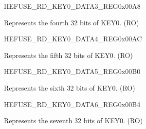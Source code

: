 \begin{register}{H}{EFUSE\_RD\_KEY0\_DATA3\_REG}{0x{}00A8}\label{regdesc:EFUSERDKEY0DATA3REG}
%
\regnewline%
\begin{regdesc}\begin{reglist}
\label{fielddesc:EFUSEKEY0DATA3}\item [EFUSE\_KEY0\_DATA3] Represents the fourth 32 bits of KEY0. (RO)
\end{reglist}\end{regdesc}
\end{register}


\begin{register}{H}{EFUSE\_RD\_KEY0\_DATA4\_REG}{0x{}00AC}\label{regdesc:EFUSERDKEY0DATA4REG}
%
\regnewline%
\begin{regdesc}\begin{reglist}
\label{fielddesc:EFUSEKEY0DATA4}\item [EFUSE\_KEY0\_DATA4] Represents the fifth 32 bits of KEY0. (RO)
\end{reglist}\end{regdesc}
\end{register}


\begin{register}{H}{EFUSE\_RD\_KEY0\_DATA5\_REG}{0x{}00B0}\label{regdesc:EFUSERDKEY0DATA5REG}
%
\regnewline%
\begin{regdesc}\begin{reglist}
\label{fielddesc:EFUSEKEY0DATA5}\item [EFUSE\_KEY0\_DATA5] Represents the sixth 32 bits of KEY0. (RO)
\end{reglist}\end{regdesc}
\end{register}


\begin{register}{H}{EFUSE\_RD\_KEY0\_DATA6\_REG}{0x{}00B4}\label{regdesc:EFUSERDKEY0DATA6REG}
%
\regnewline%
\begin{regdesc}\begin{reglist}
\label{fielddesc:EFUSEKEY0DATA6}\item [EFUSE\_KEY0\_DATA6] Represents the seventh 32 bits of KEY0. (RO)
\end{reglist}\end{regdesc}
\end{register}


